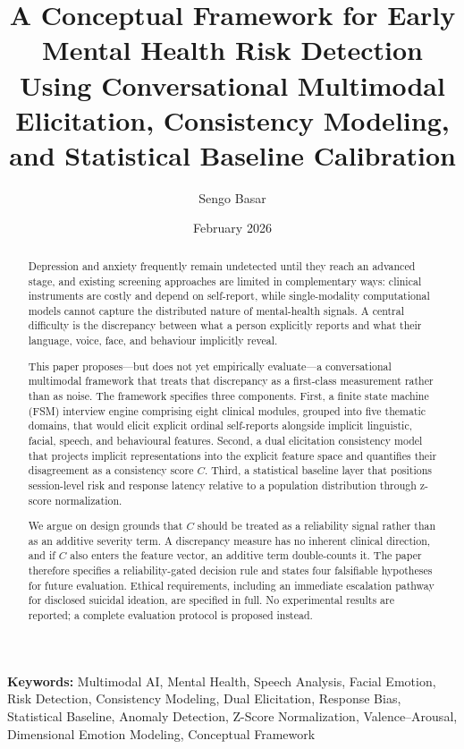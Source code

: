 \documentclass[12pt]{article}
\title{A Conceptual Framework for Early Mental Health Risk Detection Using
Conversational Multimodal Elicitation, Consistency Modeling, and
Statistical Baseline Calibration}
\author{Sengo Basar}
\date{February 2026}
\begin{document}
\maketitle

\begin{abstract}
Depression and anxiety frequently remain undetected until they reach an
advanced stage, and existing screening approaches are limited in
complementary ways: clinical instruments are costly and depend on
self-report, while single-modality computational models cannot capture
the distributed nature of mental-health signals. A central difficulty is
the discrepancy between what a person explicitly reports and what their
language, voice, face, and behaviour implicitly reveal.

This paper proposes---but does not yet empirically evaluate---a
conversational multimodal framework that treats that discrepancy as a
first-class measurement rather than as noise. The framework specifies
three components. First, a finite state machine (FSM) interview engine
comprising eight clinical modules, grouped into five thematic domains,
that would elicit explicit ordinal self-reports alongside implicit
linguistic, facial, speech, and behavioural features. Second, a dual
elicitation consistency model that projects implicit representations
into the explicit feature space and quantifies their disagreement as a
consistency score $C$. Third, a statistical baseline layer that
positions session-level risk and response latency relative to a
population distribution through z-score normalization.

We argue on design grounds that $C$ should be treated as a reliability
signal rather than as an additive severity term. A discrepancy measure
has no inherent clinical direction, and if $C$ also enters the feature
vector, an additive term double-counts it. The paper therefore specifies
a reliability-gated decision rule and states four falsifiable hypotheses
for future evaluation. Ethical requirements, including an immediate
escalation pathway for disclosed suicidal ideation, are specified in
full. No experimental results are reported; a complete evaluation
protocol is proposed instead.
\end{abstract}

\noindent\textbf{Keywords:} Multimodal AI, Mental Health, Speech Analysis,
Facial Emotion, Risk Detection, Consistency Modeling, Dual Elicitation,
Response Bias, Statistical Baseline, Anomaly Detection, Z-Score
Normalization, Valence--Arousal, Dimensional Emotion Modeling, Conceptual
Framework
\end{document}
